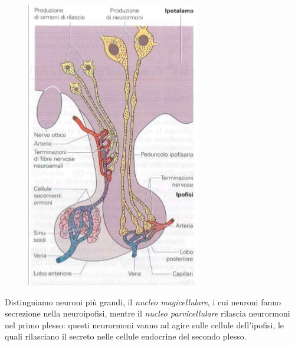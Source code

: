 \documentclass[a4paper,12pt]{article}
\begin{document}
\begin{figure}[H]
\centering
\includegraphics[scale=0.4]{immagine/magnoparvi.jpg}
\caption{}
\end{figure}

Distinguiamo neuroni più grandi, il \emph{nucleo magicellulare}, i cui neuroni fanno secrezione nella neuroipofisi, mentre il \emph{nucleo parvicellulare} rilascia neurormoni nel primo plesso: questi neurormoni vanno ad agire sulle cellule dell'ipofisi, le quali rilasciano il secreto nelle cellule endocrine del secondo plesso. 

\paragraph{}
\end{document}

